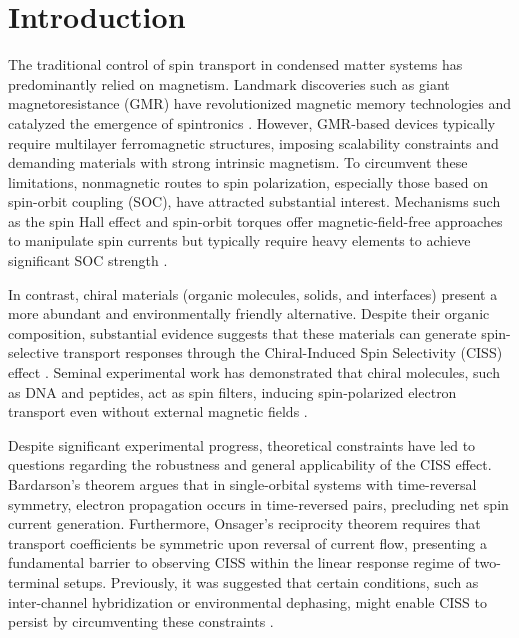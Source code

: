 \documentclass[aps,prb,10pt,superscriptaddress,showkeys,twocolumn,floatfix]{revtex4-1}
\begin{document}
\maketitle

\section{Introduction}
The traditional control of spin transport in condensed matter systems has predominantly relied on magnetism. Landmark discoveries such as giant magnetoresistance (GMR) have revolutionized magnetic memory technologies and catalyzed the emergence of spintronics \cite{Baibich1988}. However, GMR-based devices typically require multilayer ferromagnetic structures, imposing scalability constraints and demanding materials with strong intrinsic magnetism. To circumvent these limitations, nonmagnetic routes to spin polarization, especially those based on spin-orbit coupling (SOC), have attracted substantial interest. Mechanisms such as the spin Hall effect and spin-orbit torques offer magnetic-field-free approaches to manipulate spin currents but typically require heavy elements to achieve significant SOC strength \cite{Manchon2019}.

In contrast, chiral materials (organic molecules, solids, and interfaces) present a more abundant and environmentally friendly alternative. Despite their organic composition, substantial evidence suggests that these materials can generate spin-selective transport responses through the Chiral-Induced Spin Selectivity (CISS) effect \cite{Aiello2022}. Seminal experimental work has demonstrated that chiral molecules, such as DNA and peptides, act as spin filters, inducing spin-polarized electron transport even without external magnetic fields \cite{Ray1999,Xie2011,Kiran2016}. 

Despite significant experimental progress, theoretical constraints have led to questions regarding the robustness and general applicability of the CISS effect. Bardarson's theorem \cite{Bardarson2008} argues that in single-orbital systems with time-reversal symmetry, electron propagation occurs in time-reversed pairs, precluding net spin current generation. Furthermore, Onsager's reciprocity theorem \cite{buttiker1986role,Jacquod2012} requires that transport coefficients be symmetric upon reversal of current flow, presenting a fundamental barrier to observing CISS within the linear response regime of two-terminal setups. Previously, it was suggested that certain conditions, such as inter-channel hybridization or environmental dephasing, might enable CISS to persist by circumventing these constraints \cite{Matityahu2016,Mena2024,Huisman2021}. 
\end{document}
